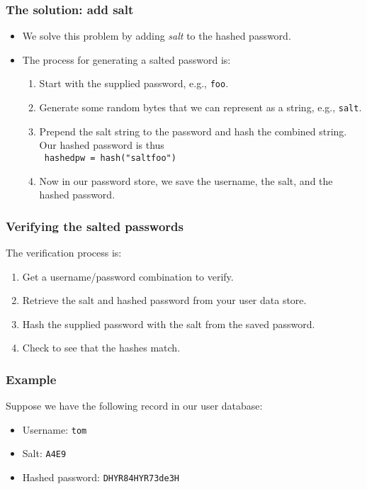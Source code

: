 \documentclass[10pt]{beamer}
\begin{document}
\begin{frame}
	\frametitle{The solution:  add salt}
	\begin{itemize}
		\item We solve this problem by adding \emph{salt} to the hashed password.
		\item The process for generating a salted password is:
			\begin{enumerate}
				\item Start with the supplied password, e.g., \texttt{foo}.
				\item Generate some random bytes that we can represent
					as a string, e.g., \texttt{salt}.
				\item Prepend the salt string to the password and hash 
					the combined string.  Our hashed password is thus \\
					\texttt{ hashedpw = hash("saltfoo")}
				\item Now in our password store, we save the username,
					the salt, and the hashed password.
			\end{enumerate}
	\end{itemize}
\end{frame}
\begin{frame}
	\frametitle{Verifying the salted passwords}
	The verification process is:
	\begin{enumerate}
		\item Get a username/password combination to verify.
		\item Retrieve the salt and hashed password from your
			user data store.
		\item Hash the supplied password with the salt from the saved password.
		\item Check to see that the hashes match.
	\end{enumerate}
\end{frame}

\begin{frame}
	\frametitle{Example}
	
	Suppose we have the following record in our user database:
	
	\begin{itemize}
		\item Username: \texttt{tom}
		\item Salt: \texttt{A4E9}
		\item Hashed password: \texttt{DHYR84HYR73de3H}
	\end{itemize}
	
\end{frame}
\end{document}
